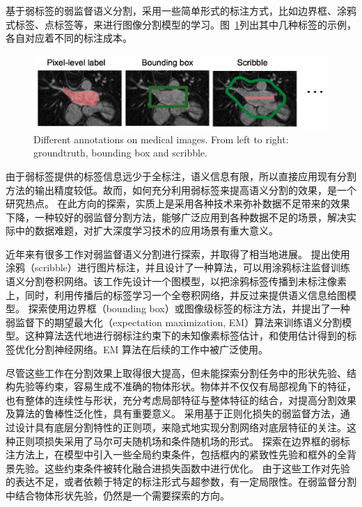 基于弱标签的弱监督语义分割，采用一些简单形式的标注方式，比如边界框、涂鸦式标签、点标签等，来进行图像分割模型的学习。图~\ref{c1_fig2}列出其中几种标签的示例，各自对应着不同的标注成本。
    \begin{figure}[tbp]
        \centering 
        \includegraphics[width=1.0\textwidth]{img/c1/intro_2.png}
        {Different annotations on medical images. From left to right: groundtruth, bounding box and scribble.}
        \label{c1_fig2}
    \end{figure}
由于弱标签提供的标签信息远少于全标注，语义信息有限，所以直接应用现有分割方法的输出精度较低。故而，如何充分利用弱标签来提高语义分割的效果，是一个研究热点。
在此方向的探索，实质上是采用各种技术来弥补数据不足带来的效果下降，一种较好的弱监督分割方法，能够广泛应用到各种数据不足的场景，解决实际中的数据难题，对扩大深度学习技术的应用场景有重大意义。

近年来有很多工作对弱监督语义分割进行探索，并取得了相当地进展。
\citet{lin2016scribblesup} 提出使用涂鸦（scribble）进行图片标注，并且设计了一种算法，可以用涂鸦标注监督训练语义分割卷积网络。该工作先设计一个图模型，以把涂鸦标签传播到未标注像素上，同时，利用传播后的标签学习一个全卷积网络，并反过来提供语义信息给图模型。
\citet{papandreou2015weakly} 探索使用边界框（bounding box）或图像级标签的标注方法，并提出了一种弱监督下的期望最大化（expectation maximization, EM）算法来训练语义分割模型。这种算法迭代地进行弱标注约束下的未知像素标签估计，和使用估计得到的标签优化分割神经网络。EM 算法在后续的工作中被广泛使用。

尽管这些工作在分割效果上取得很大提高，但未能探索分割任务中的形状先验、结构先验等约束，容易生成不准确的物体形状。物体并不仅仅有局部视角下的特征，也有整体的连续性与形状，充分考虑局部特征与整体特征的结合，对提高分割效果及算法的鲁棒性泛化性，具有重要意义。
\citet{tang2018regularized} 采用基于正则化损失的弱监督方法，通过设计具有底层分割特性的正则项，来隐式地实现分割网络对底层特征的关注。这种正则项损失采用了马尔可夫随机场和条件随机场的形式。
\citet{kervadec2020bounding} 探索在边界框的弱标注方法上，在模型中引入一些全局约束条件，包括框内的紧致性先验和框外的全背景先验。这些约束条件被转化融合进损失函数中进行优化。
由于这些工作对先验的表达不足，或者依赖于特定的标注形式与超参数，有一定局限性。在弱监督分割中结合物体形状先验，仍然是一个需要探索的方向。

